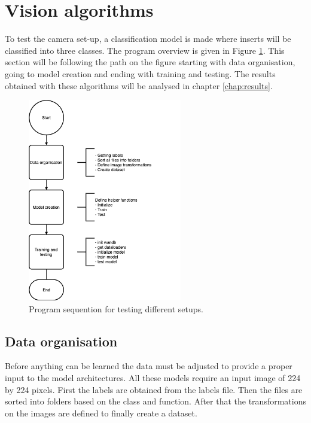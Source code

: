 \section{Vision algorithms}
\label{sec:impl:visionalgorithms}
	To test the camera set-up, a classification model is made where inserts will be classified into three classes. The program overview is given in Figure \ref{fig:impl:va:prog:overview}. This section will be following the path on the figure starting with data organisation, going to model creation and ending with training and testing. The results obtained with these algorithms will be analysed in chapter \ref{chap:results}. 
	
	\begin{figure}[hbtp]
		\centering
		\includegraphics[width=0.6\textwidth]{fig/Vision/GoogleColab/Test_Camera_Setup/Program_sequention.png}
		\caption{Program sequention for testing different setups.}
		\label{fig:impl:va:prog:overview}
	\end{figure}
	
	\subsection{Data organisation}
	\label{sec:impl:visionalgorithms:dataorganisation}
		Before anything can be learned the data must be adjusted to provide a proper input to the model architectures. All these models require an input image of 224 by 224 pixels. First the labels are obtained from the labels file. Then the files are sorted into folders based on the class and function. After that the transformations on the images are defined to finally create a dataset. 
		
